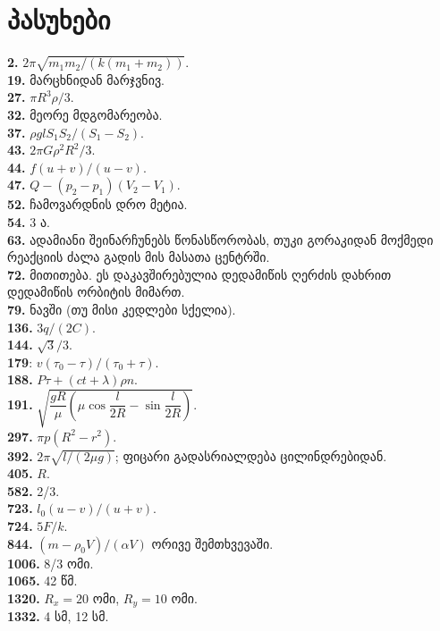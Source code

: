 \documentclass[12pt,a4paper,]{report}
\begin{document}
\chapter{პასუხები}
\textbf{2.} $2\pi\sqrt{m_1 m_2 / (k(m_1 + m_2))}$. \\
\textbf{19.} მარცხნიდან მარჯვნივ. \\
\textbf{27.} $\pi R^3 \rho /3$. \\
\textbf{32.} მეორე მდგომარეობა. \\
\textbf{37.} $\rho glS_1S_2/(S_1-S_2)$. \\
\textbf{43.} $2\pi G\rho^2R^2/3.$ \\
\textbf{44.} $f(u + v)/(u - v)$. \\
\textbf{47.} $Q - (p_2 - p_1)(V_2 - V_1)$. \\
\textbf{52.} ჩამოვარდნის დრო მეტია. \\
\textbf{54.} 3 ა. \\
\textbf{63.} ადამიანი შეინარჩუნებს წონასწორობას, თუკი გორაკიდან მოქმედი რეაქციის ძალა გადის მის მასათა ცენტრში. \\
\textbf{72.} მითითება. ეს დაკავშირებულია დედამიწის ღერძის დახრით დედამიწის ორბიტის მიმართ. \\
\textbf{79.} ნავში (თუ მისი კედლები სქელია). \\
\textbf{136.} $3q/(2C)$. \\
\textbf{144.} $\sqrt{3}/3$. \\ 
\textbf{179}: $v(\tau_0-\tau)/(\tau_0+\tau)$. \\
\textbf{188.} $P\tau+(ct+\lambda)\rho n$. \\
\textbf{191.} $\sqrt{\dfrac{gR}{\mu}\left(\mu\cos{\dfrac{l}{2R}} - \sin{\dfrac{l}{2R}}\right)}.$ \\
\textbf{297.} $\pi p(R^2-r^2)$. \\
\textbf{392.} $2\pi\sqrt{l/(2\mu g)}$; ფიცარი გადასრიალდება ცილინდრებიდან. \\
\textbf{405.} $R$. \\
\textbf{582.} 2/3. \\
\textbf{723.} $l_0(u-v)/(u+v)$. \\
\textbf{724.} $5F/k$. \\
\textbf{844.} $(m-\rho_0 V)/(\alpha V)$ ორივე შემთხვევაში.\\
\textbf{1006.} 8/3 ომი. \\
\textbf{1065.} 42 წმ. \\
\textbf{1320.} $R_x=20$ ომი, $R_y=10$ ომი.\\
\textbf{1332.} 4 სმ, 12 სმ. \\
\end{document}
